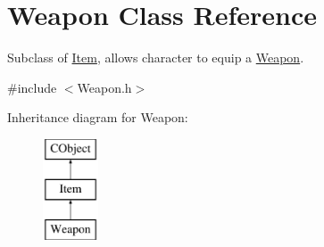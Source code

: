 \hypertarget{class_weapon}{}\section{Weapon Class Reference}
\label{class_weapon}


Subclass of \hyperlink{class_item}{Item}, allows character to equip a \hyperlink{class_weapon}{Weapon}.  




{\ttfamily \#include $<$Weapon.\+h$>$}

Inheritance diagram for Weapon\+:\begin{figure}[H]
\begin{center}
\leavevmode
\includegraphics[height=3.000000cm]{class_weapon}
\end{center}
\end{figure}
